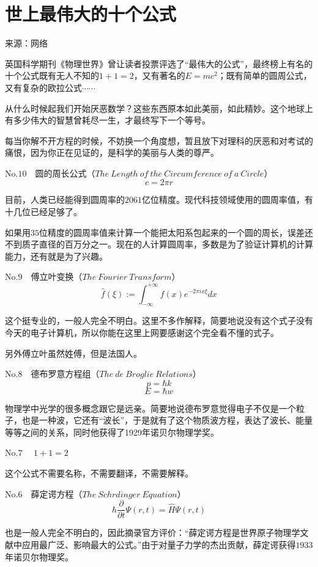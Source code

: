 \chapter{世上最伟大的十个公式}

来源：网络

英国科学期刊《物理世界》曾让读者投票评选了“最伟大的公式”，最终榜上有名的十个公式既有无人不知的$1+1=2$，又有著名的$E=mc^2$；既有简单的圆周公式，又有复杂的欧拉公式$\cdots\cdots$

从什么时候起我们开始厌恶数学？这些东西原本如此美丽，如此精妙。这个地球上有多少伟大的智慧曾耗尽一生，才最终写下一个等号。

每当你解不开方程的时候，不妨换一个角度想，暂且放下对理科的厌恶和对考试的痛恨，因为你正在见证的，是科学的美丽与人类的尊严。

No.$10\quad$圆的周长公式（$The\ Length\ of\ the\ Circumference\ of\ a\ Circle$）$$c=2\pi r$$

目前，人类已经能得到圆周率的$2061$亿位精度。现代科技领域使用的圆周率值，有十几位已经足够了。

如果用$35$位精度的圆周率值来计算一个能把太阳系包起来的一个圆的周长，误差还不到质子直径的百万分之一。现在的人计算圆周率，多数是为了验证计算机的计算能力，还有就是为了兴趣。

No.$9\quad$傅立叶变换（$The\ Fourier\ Transform$）$$\hat{f}(\xi):=\displaystyle\int_{-\infty}^{+\infty} f(x)e^{-2\pi ix\xi}dx$$

这个挺专业的，一般人完全不明白。这里不多作解释，简要地说没有这个式子没有今天的电子计算机，所以你能在这里上网要感谢这个完全看不懂的式子。

另外傅立叶虽然姓傅，但是法国人。

No.$8\quad$德布罗意方程组（$The\ de\ Broglie\ Relations$）$$p=\hbar k$$ $$E=\hbar w $$

物理学中光学的很多概念跟它是远亲。简要地说德布罗意觉得电子不仅是一个粒子，也是一种波，它还有“波长”，于是就有了这个物质波方程，表达了波长、能量等等之间的关系，同时他获得了1929年诺贝尔物理学奖。

No.$7\quad$ $1+1=2$

这个公式不需要名称，不需要翻译，不需要解释。

No.$6\quad$薛定谔方程（$The\ Schrdinger\ Equation$）$$\hbar\displaystyle\frac{\displaystyle\partial}{\displaystyle\partial t}\Psi (r,t)=\hat{H}\Psi(r,t)$$

也是一般人完全不明白的，因此摘录官方评价：“薛定谔方程是世界原子物理学文献中应用最广泛、影响最大的公式。”由于对量子力学的杰出贡献，薛定谔获得$1933$年诺贝尔物理奖。

